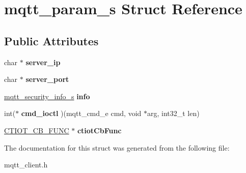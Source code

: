 \hypertarget{structmqtt__param__s}{}\section{mqtt\+\_\+param\+\_\+s Struct Reference}
\label{structmqtt__param__s}
\subsection*{Public Attributes}
\begin{DoxyCompactItemize}
\item 
\mbox{\label{structmqtt__param__s_ae04d9f389be9bb51143671b0a789ae38}} 
char $\ast$ {\bfseries server\+\_\+ip}
\item 
\mbox{\label{structmqtt__param__s_a4f7494365898bcaaa1d1a408a4c42e76}} 
char $\ast$ {\bfseries server\+\_\+port}
\item 
\mbox{\label{structmqtt__param__s_ae1b7de29eca488dfb88f02cfc7c3cbd8}} 
\mbox{\hyperlink{structmqtt__security__info__s}{mqtt\+\_\+security\+\_\+info\+\_\+s}} {\bfseries info}
\item 
\mbox{\label{structmqtt__param__s_a7f68abf5a9961162ba5b4cd4fc8d008d}} 
int($\ast$ {\bfseries cmd\+\_\+ioctl} )(mqtt\+\_\+cmd\+\_\+e cmd, void $\ast$arg, int32\+\_\+t len)
\item 
\mbox{\label{structmqtt__param__s_a771f237292d152d6fe71d4acf9564469}} 
\mbox{\hyperlink{struct_c_t_i_o_t___c_b___f_u_n_c}{C\+T\+I\+O\+T\+\_\+\+C\+B\+\_\+\+F\+U\+NC}} $\ast$ {\bfseries ctiot\+Cb\+Func}
\end{DoxyCompactItemize}


The documentation for this struct was generated from the following file\+:\begin{DoxyCompactItemize}
\item 
mqtt\+\_\+client.\+h\end{DoxyCompactItemize}
